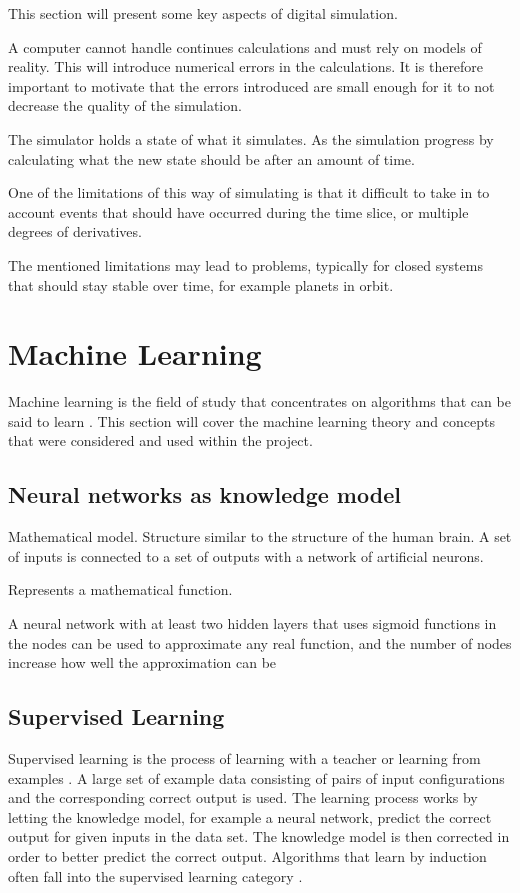 This section will present some key aspects of digital simulation. 

A computer cannot handle continues calculations and must rely on models of reality. This will introduce numerical errors in the calculations. It is therefore important to motivate that the errors introduced are small enough for it to not decrease the quality of the simulation.

The simulator holds a state of what it simulates. As the simulation progress by calculating what the new state should be after an amount of time. 

One of the limitations of this way of simulating is that it difficult to take in to account events that should have occurred during the time slice, or multiple degrees of derivatives. 

The mentioned limitations may lead to problems, typically for closed systems that should stay stable over time, for example planets in orbit. 



\section{Machine Learning}
Machine learning is the field of study that concentrates on algorithms that can be said to learn \cite{glossary}. This section will cover the machine learning theory and concepts that were considered and used within the project. 

\subsection{Neural networks as knowledge model}
Mathematical model. Structure similar to the structure of the human brain. A set of inputs is connected to a set of outputs with a network of artificial neurons. 

Represents a mathematical function.

A neural network with at least two hidden layers that uses sigmoid functions in the nodes can be used to approximate any real function, and the number of nodes increase how well the approximation can be \cite{mitchel:approximation}


\subsection{Supervised Learning}
Supervised learning is the process of learning with a teacher or learning from examples \cite{haykin:supervised}. A large set of example data consisting of pairs of input configurations and the corresponding correct output is used. The learning process works by letting the knowledge model, for example a neural network, predict the correct output for given inputs in the data set. The knowledge model is then corrected in order to better predict the correct output. Algorithms that learn by induction often fall into the supervised learning category \cite{glossary}.  

